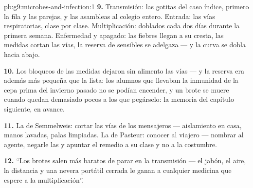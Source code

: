 \begin{solution}{pb:g9:microbes-and-infection:1}
\textbf{9.} Transmisión: las gotitas del caso índice, primero la fila y
las parejas, y las asambleas al colegio entero. Entrada: las vías
respiratorias, clase por clase. Multiplicación: doblados cada dos días
durante la primera semana. Enfermedad y apagado: las fiebres llegan a
su cresta, las medidas cortan las vías, la reserva de sensibles se
adelgaza --- y la curva se dobla hacia abajo.

\textbf{10.} Los bloqueos de las medidas dejaron sin alimento las vías
--- y la reserva era además más pequeña que la lista: los alumnos que
llevaban la inmunidad de la cepa prima del invierno pasado no se podían
encender, y un brote se muere cuando quedan demasiado pocos a los que
pegárselo: la memoria del capítulo siguiente, en avance.

\textbf{11.} La de Semmelweis: cortar las vías de los mensajeros ---
aislamiento en casa, manos lavadas, palas limpiadas. La de Pasteur:
conocer al viajero --- nombrar al agente, negarle las  y
apuntar el remedio a su clase y no a la costumbre.

\textbf{12.} ``Los brotes salen más baratos de parar en la transmisión
--- el jabón, el aire, la distancia y una nevera portátil cerrada le
ganan a cualquier medicina que espere a la multiplicación''.
\end{solution}
